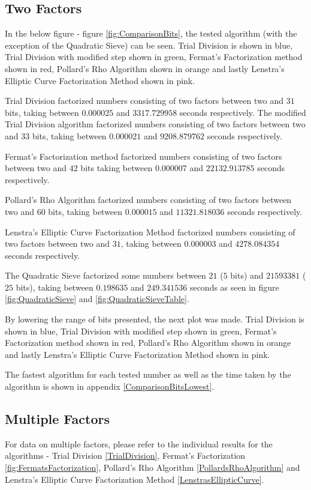 \subsection{Two Factors}

In the below figure - figure \ref{fig:ComparisonBits}, the tested algorithm (with the exception of the Quadratic Sieve) can be seen. Trial Division is shown in blue, Trial Division with modified step shown in green, Fermat's Factorization method shown in red, Pollard's Rho Algorithm shown in orange and lastly Lenstra's Elliptic Curve Factorization Method shown in pink.



Trial Division factorized numbers consisting of two factors between two and $31$ bits, taking between $0.000025$ and $3317.729958$ seconds respectively. The modified Trial Division algorithm factorized numbers consisting of two factors between two and $33$ bits, taking between $0.000021$ and $9208.879762$ seconds respectively.

Fermat's Factorization method factorized numbers consisting of two factors between two and $42$ bits taking between $0.000007$ and $22132.913785$ seconds respectively.

Pollard's Rho Algorithm factorized numbers consisting of two factors between two and $60$ bits, taking between $0.000015$ and $11321.818036$ seconds respectively.

Lenstra's Elliptic Curve Factorization Method factorized numbers consisting of two factors between two and $31$, taking between $0.000003$ and $4278.084354$ seconds respectively.

The Quadratic Sieve factorized some numbers between $21$ ($5$ bits) and $21593381$ ($25$ bits), taking between $0.198635$ and $249.341536$ seconds as seen in figure \ref{fig:QuadraticSieve} and \ref{fig:QuadraticSieveTable}.

By lowering the range of bits presented, the next plot was made. Trial Division is shown in blue, Trial Division with modified step shown in green, Fermat's Factorization method shown in red, Pollard's Rho Algorithm shown in orange and lastly Lenstra's Elliptic Curve Factorization Method shown in pink.





The fastest algorithm for each tested number as well as the time taken by the algorithm is shown in appendix \ref{ComparisonBitsLowest}.

\subsection{Multiple Factors}

For data on multiple factors, please refer to the individual results for the algorithms - Trial Division \ref{TrialDivision}, Fermat's Factorization \ref{fig:FermatsFactorization}, Pollard's Rho Algorithm \ref{PollardsRhoAlgorithm} and Lenstra's Elliptic Curve Factorization Method \ref{LenstrasEllipticCurve}.